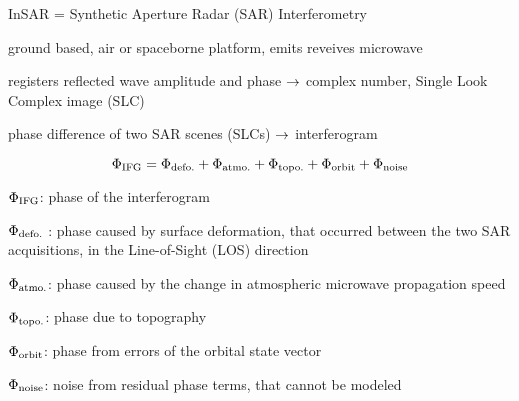 \documentclass[a0, 18pt, landscape]{a0poster}
\begin{document}
\Large\bfseries

\begin{multicols}{3}

    \bitz
        \item InSAR = Synthetic Aperture Radar (SAR) Interferometry
        \item ground based, air or spaceborne platform, emits reveives microwave
        \item registers reflected wave amplitude and phase $\rightarrow$ complex number, Single Look Complex image (SLC)
        \item phase difference of two SAR scenes (SLCs) $\rightarrow$ interferogram
    \eitz
    
    \[
        \Phi_{\text{IFG}} = \Phi_{\text{defo.}} + \Phi_{\text{atmo.}} + \Phi_{\text{topo.}} + \Phi_{\text{orbit}} + \Phi_{\text{noise}}
    \]
    
    \efig
    
    \vspace{20pt}
    
    
    \bitz
        \item $\Phi_{\text{IFG}}$: phase of the interferogram 
        \item $\Phi_{\text{defo.}}$ : phase caused by surface deformation, that occurred between the two SAR acquisitions, in the Line-of-Sight (LOS) direction
        \item $\Phi_{\text{atmo.}}$: phase caused by the change in atmospheric microwave propagation speed
        \item $\Phi_{\text{topo.}}$: phase due to topography
        \item $\Phi_{\text{orbit}}$: phase from errors of the orbital state vector
        \item $\Phi_{\text{noise}}$: noise from residual phase terms, that cannot be modeled
    \eitz
\eblock

\end{multicols}
\end{document}
